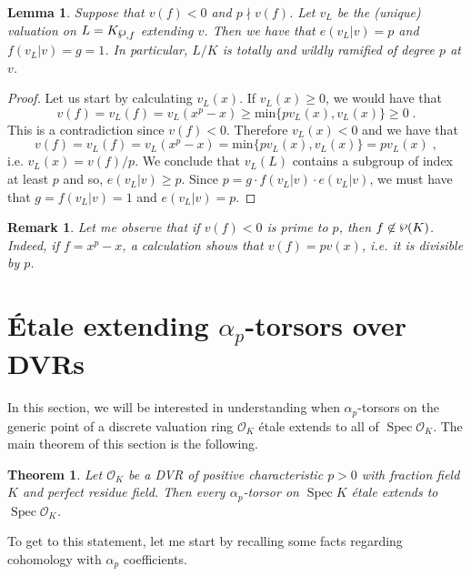 \documentclass[a4paper,english,12pt]{amsart}
\newtheorem{theorem}[definition]{Theorem}
\newtheorem{lemma}[definition]{Lemma}
\newtheorem{remark}[definition]{Remark}
\numberwithin{equation}{section}
\DeclareMathOperator{\Spec}{Spec}
\renewcommand{\geq}{\geqslant}
\renewcommand{\wp}{\ensuremath\raisebox{\depth}{$\mathchar"17D$}}
\renewcommand{\_}{\rule{0.25cm}{0.4pt}}
\begin{document}
\begin{lemma}\label{AS totally-ramified}
Suppose that $v(f) < 0$ and $p \nmid v(f)$. Let $v_{L}$ be the (unique) valuation on $L=K_{\wp, f}$ extending $v$. Then we have that $e(v_{L}| v)=p$ and $f(v_{L}| v)=g=1$. In particular, $L/K$ is totally and wildly ramified of degree $p$ at $v$.
\end{lemma}
\begin{proof}
Let us start by calculating $v_{L}(x)$. If $v_{L}(x)\geq 0$, we would have that
\[
v(f)=v_{L}(f)=v_{L}(x^{p}-x)\geq\text{min}\{pv_{L}(x),v_{L}(x)\}\geq 0\;.
\]
This is a contradiction since $v(f)<0$. Therefore $v_{L}(x)<0$ and we have that
\[
v(f)=v_{L}(f)=v_{L}(x^{p}-x)=\text{min}\{pv_{L}(x),v_{L}(x)\}=pv_{L}(x)\;,
\]
i.e. $v_{L}(x)=v(f)/p$. We conclude that $v_{L}(L)$ contains a subgroup of index at least $p$ and so, $e(v_{L}|v)\geq p$. Since $p=g\cdot f(v_{L}|v)\cdot e(v_{L}|v)$, we must have that $g=f(v_{L}|v)=1$ and $e(v_{L}|v)=p$.
\end{proof}

\begin{remark}
Let me observe that if $v(f)<0$ is prime to $p$, then $f\not\in \wp(K)$. Indeed, if $f=x^{p}-x$, a calculation shows that $v(f)=pv(x)$, i.e. it is divisible by $p$.
\end{remark}

\section{Étale extending $\alpha_{p}$-torsors over DVRs}\label{2}
In this section, we will be interested in understanding when $\alpha_{p}$-torsors on the generic point of a discrete valuation ring $\mathcal{O}_{K}$ étale extends to all of $\Spec \mathcal{O}_{K}$. The main theorem of this section is the following.

\begin{theorem}\label{teorema principal}
    Let $\mathcal{O}_{K}$ be a DVR of positive characteristic $p>0$ with fraction field $K$ and perfect residue field. Then every $\alpha_{p}$-torsor on $\Spec K$ étale extends to $\Spec \mathcal{O}_{K}$.
\end{theorem}

To get to this statement, let me start by recalling some facts regarding cohomology with $\alpha_{p}$ coefficients.
\end{document}
